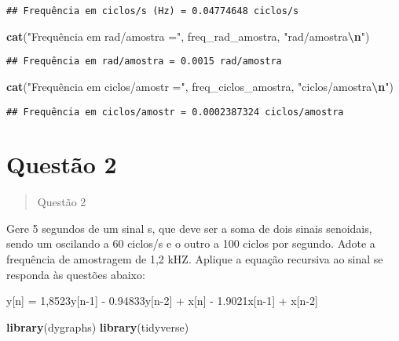 \documentclass[
]{article}
\newenvironment{Shaded}{\begin{snugshade}}{\end{snugshade}}
\newcommand{\FunctionTok}[1]{\textcolor[rgb]{0.13,0.29,0.53}{\textbf{#1}}}
\newcommand{\NormalTok}[1]{#1}
\newcommand{\SpecialCharTok}[1]{\textcolor[rgb]{0.81,0.36,0.00}{\textbf{#1}}}
\newcommand{\StringTok}[1]{\textcolor[rgb]{0.31,0.60,0.02}{#1}}
\begin{document}
\begin{verbatim}
## Frequência em ciclos/s (Hz) = 0.04774648 ciclos/s
\end{verbatim}

\begin{Shaded}
\begin{Highlighting}[]
\FunctionTok{cat}\NormalTok{(}\StringTok{"Frequência em rad/amostra ="}\NormalTok{, freq\_rad\_amostra, }\StringTok{"rad/amostra}\SpecialCharTok{\textbackslash{}n}\StringTok{"}\NormalTok{)}
\end{Highlighting}
\end{Shaded}

\begin{verbatim}
## Frequência em rad/amostra = 0.0015 rad/amostra
\end{verbatim}

\begin{Shaded}
\begin{Highlighting}[]
\FunctionTok{cat}\NormalTok{(}\StringTok{"Frequência em ciclos/amostr ="}\NormalTok{, freq\_ciclos\_amostra, }\StringTok{"ciclos/amostra}\SpecialCharTok{\textbackslash{}n}\StringTok{"}\NormalTok{)}
\end{Highlighting}
\end{Shaded}

\begin{verbatim}
## Frequência em ciclos/amostr = 0.0002387324 ciclos/amostra
\end{verbatim}

\newpage
\section*{Questão 2}

\begin{quote}
Questão 2
\end{quote}

Gere 5 segundos de um sinal s, que deve ser a soma de dois sinais
senoidais, sendo um oscilando a 60 ciclos/s e o outro a 100 ciclos por
segundo. Adote a frequência de amostragem de 1,2 kHZ. Aplique a equação
recursiva ao sinal se responda às questões abaixo:

y{[}n{]} = 1,8523y{[}n-1{]} - 0.94833y{[}n-2{]} + x{[}n{]} -
1.9021x{[}n-1{]} + x{[}n-2{]}

\begin{Shaded}
\begin{Highlighting}[]
\FunctionTok{library}\NormalTok{(dygraphs)}
\FunctionTok{library}\NormalTok{(tidyverse)}
\end{Highlighting}
\end{Shaded}
\end{document}
